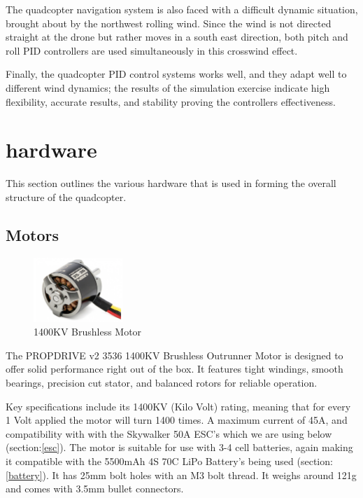 \documentclass{report}
\begin{document}
The quadcopter navigation system is also faced with a difficult dynamic
situation, brought about by the northwest rolling wind. Since the wind is not
directed straight at the drone but rather moves in a south east direction, both
pitch and roll PID controllers are used simultaneously in this crosswind effect. 

Finally, the quadcopter PID control systems works well, and they adapt well to
different wind dynamics; the results of the simulation exercise indicate high
flexibility, accurate results, and stability proving the controllers
effectiveness. 

\chapter{hardware}\label{hardware}
 This section outlines the various hardware
that is used in forming the overall structure of the quadcopter.

\section{Motors}\label{motors}
\begin{figure}[H]
  \centering
  \includegraphics[width=0.3\textwidth]{Pictures/motors.png} 
  \caption{1400KV Brushless Motor}
  \label{fig:motor}
\end{figure}
The PROPDRIVE v2 3536 1400KV Brushless Outrunner Motor is designed to offer
solid performance right out of the box. It features tight windings, smooth
bearings, precision cut stator, and balanced rotors for reliable operation.

Key specifications include its 1400KV (Kilo Volt) rating, meaning that for every
1 Volt applied the motor will turn 1400 times. A maximum current of 45A, and
compatibility with with the Skywalker 50A ESC's which we are using below
(section:\ref{esc}). The motor is suitable for use with 3-4 cell batteries,
again making it compatible with the 5500mAh 4S 70C LiPo Battery's being used
(section:\ref{battery}). It has 25mm bolt holes with an M3 bolt thread. It
weighs around 121g and comes with 3.5mm bullet connectors.
\end{document}

